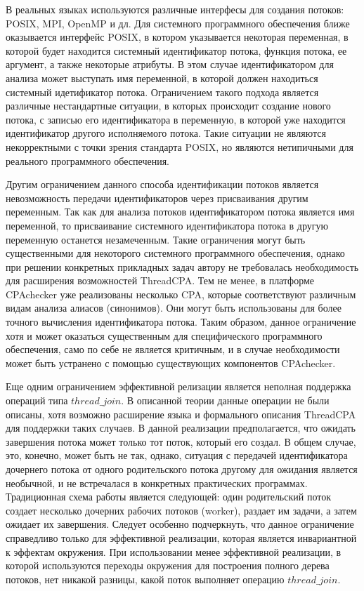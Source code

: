 В реальных языках используются различные интерфесы для создания потоков: POSIX, MPI, OpenMP и дл. 
Для системного программного обеспечения ближе оказывается интерфейс POSIX, в котором указывается некоторая переменная, в которой будет находится системный идентификатор потока, функция потока, ее аргумент, а также некоторые атрибуты. 
В этом случае идентификатором для анализа может выступать имя переменной, в которой должен находиться системный идетификатор потока.
Ограничением такого подхода является различные нестандартные ситуации, в которых происходит создание нового потока, с записью его идентификатора в переменную, в которой уже находится идентификатор другого исполняемого потока.
Такие ситуации не являются некорректными с точки зрения стандарта POSIX, но являются нетипичными для реального программного обеспечения.

Другим ограничением данного способа идентификации потоков является невозможность передачи идентификаторов через присваивания другим переменным. 
Так как для анализа потоков идентификатором потока является имя переменной, то присваивание системного идентификатора потока в другую переменную останется незамеченным.
Такие ограничения могут быть существенными для некоторого системного программного обеспечения, однако при решении конкретных прикладных задач автору не требовалась необходимость для расширения возможностей ThreadCPA.
Тем не менее, в платформе CPAchecker уже реализованы несколько CPA, которые соответствуют различным видам анализа алиасов (синонимов).
Они могут быть использованы для более точного вычисления идентификатора потока.
Таким образом, данное ограничение хотя и может оказаться существенным для специфического программного обеспечения, само по себе не является критичным, и в случае необходимости может быть устранено с помощью существующих компонентов CPAchecker.

Еще одним ограничением эффективной релизации является неполная поддержка операций типа $thread\_join$. 
В описанной теории данные операции не были описаны, хотя возможно расширение языка и формального описания ThreadCPA для поддержки таких случаев. 
В данной реализации предполагается, что ожидать завершения потока может только тот поток, который его создал.
В общем случае, это, конечно, может быть не так, однако, ситуация с передачей идентификатора дочернего потока от одного родительского потока другому для ожидания является необычной, и не встречалася в конкретных практических программах. 
Традиционная схема работы является следующей: один родительский поток создает несколько дочерних рабочих потоков (worker), раздает им задачи, а затем ожидает их завершения. 
Следует особенно подчеркнуть, что данное ограничение справедливо только для эффективной реализации, которая является инвариантной к эффектам окружения.
При использовании менее эффективной реализации, в которой используются переходы окружения для построения полного дерева потоков, нет никакой разницы, какой поток выполняет операцию $thread\_join$.

